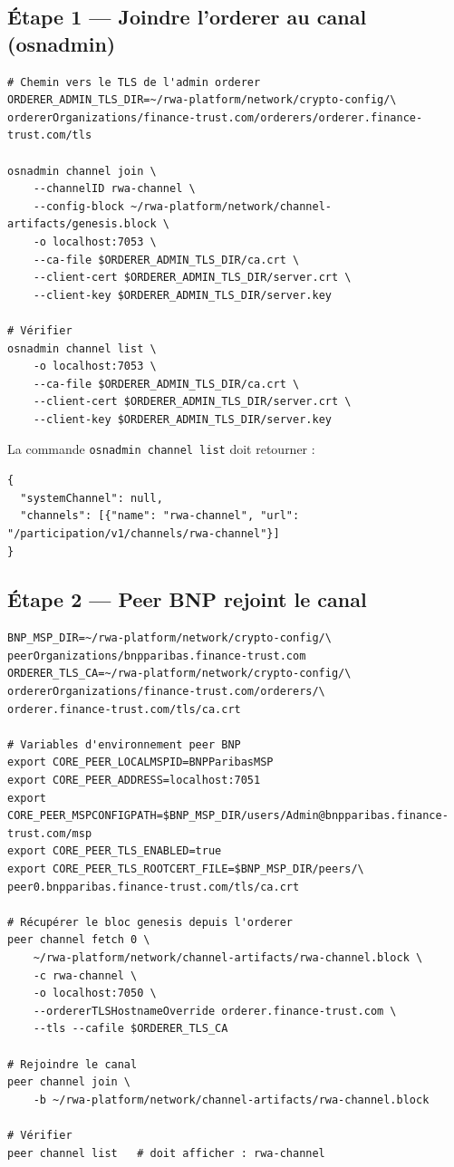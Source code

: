 \documentclass[12pt,a4paper,french]{article}
\begin{document}
\subsection{Étape 1 — Joindre l'orderer au canal (osnadmin)}

\begin{lstlisting}[style=bash, caption={Joindre l'orderer au canal via osnadmin}]
# Chemin vers le TLS de l'admin orderer
ORDERER_ADMIN_TLS_DIR=~/rwa-platform/network/crypto-config/\
ordererOrganizations/finance-trust.com/orderers/orderer.finance-trust.com/tls

osnadmin channel join \
    --channelID rwa-channel \
    --config-block ~/rwa-platform/network/channel-artifacts/genesis.block \
    -o localhost:7053 \
    --ca-file $ORDERER_ADMIN_TLS_DIR/ca.crt \
    --client-cert $ORDERER_ADMIN_TLS_DIR/server.crt \
    --client-key $ORDERER_ADMIN_TLS_DIR/server.key

# Vérifier
osnadmin channel list \
    -o localhost:7053 \
    --ca-file $ORDERER_ADMIN_TLS_DIR/ca.crt \
    --client-cert $ORDERER_ADMIN_TLS_DIR/server.crt \
    --client-key $ORDERER_ADMIN_TLS_DIR/server.key
\end{lstlisting}

\begin{successbox}
La commande \texttt{osnadmin channel list} doit retourner :
\begin{verbatim}
{
  "systemChannel": null,
  "channels": [{"name": "rwa-channel", "url": "/participation/v1/channels/rwa-channel"}]
}
\end{verbatim}
\end{successbox}

\subsection{Étape 2 — Peer BNP rejoint le canal}

\begin{lstlisting}[style=bash, caption={Faire rejoindre le peer BNP}]
BNP_MSP_DIR=~/rwa-platform/network/crypto-config/\
peerOrganizations/bnpparibas.finance-trust.com
ORDERER_TLS_CA=~/rwa-platform/network/crypto-config/\
ordererOrganizations/finance-trust.com/orderers/\
orderer.finance-trust.com/tls/ca.crt

# Variables d'environnement peer BNP
export CORE_PEER_LOCALMSPID=BNPParibasMSP
export CORE_PEER_ADDRESS=localhost:7051
export CORE_PEER_MSPCONFIGPATH=$BNP_MSP_DIR/users/Admin@bnpparibas.finance-trust.com/msp
export CORE_PEER_TLS_ENABLED=true
export CORE_PEER_TLS_ROOTCERT_FILE=$BNP_MSP_DIR/peers/\
peer0.bnpparibas.finance-trust.com/tls/ca.crt

# Récupérer le bloc genesis depuis l'orderer
peer channel fetch 0 \
    ~/rwa-platform/network/channel-artifacts/rwa-channel.block \
    -c rwa-channel \
    -o localhost:7050 \
    --ordererTLSHostnameOverride orderer.finance-trust.com \
    --tls --cafile $ORDERER_TLS_CA

# Rejoindre le canal
peer channel join \
    -b ~/rwa-platform/network/channel-artifacts/rwa-channel.block

# Vérifier
peer channel list   # doit afficher : rwa-channel
\end{lstlisting}
\end{document}
